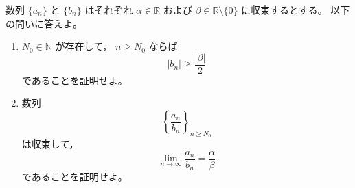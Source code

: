 \begin{exercise}
	数列 $\{a_n\}$ と $\{b_n\}$ はそれぞれ
	$\alpha\in\mathbb{R}$ および
	$\beta\in\mathbb{R}\setminus\{0\}$ に収束するとする。
	以下の問いに答えよ。

	\begin{enumerate}
		\item $N_0\in\mathbb{N}$ が存在して，
		$n\geq N_0$ ならば
		\[
			|b_n|\geq \frac{|\beta|}{2}
		\]
		であることを証明せよ。

		\item 数列
		\[
			\left\{\frac{a_n}{b_n}\right\}_{n\geq N_0}
		\]
		は収束して，
		\[
			\lim_{n\to\infty}\frac{a_n}{b_n}
			=
			\frac{\alpha}{\beta}
		\]
		であることを証明せよ。
	\end{enumerate}
\end{exercise}

